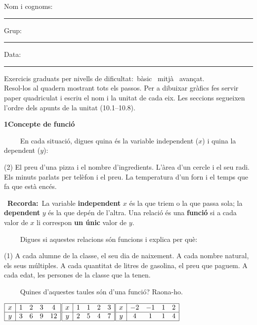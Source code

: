 \documentclass[11pt,a4paper]{article}
\newcommand{\estrelles}[1]{{\color{accent}\ifcase#1\or\faStar\faStar[regular]\faStar[regular]\or\faStar\faStar\faStar[regular]\or\faStar\faStar\faStar\fi}}
\newcounter{exer}
\newcommand{\ex}[1]{\par\needspace{4\baselineskip}\medskip\stepcounter{exer}\noindent{\color{navy}\bfseries\theexer.}\ \ {\small\estrelles{#1}}\ \ }
\newcommand{\seccio}[2]{\par\needspace{10\baselineskip}\bigskip
  \begin{tcolorbox}[colback=navy,colframe=navy,coltext=white,arc=2mm,boxrule=0pt,left=3mm,right=3mm,top=1.2mm,bottom=1.2mm]
  {\large\bfseries #1\quad #2}
  \end{tcolorbox}\vspace{-2pt}}
\newcommand{\recorda}[1]{\par\smallskip\begin{tcolorbox}[colback=accent!7,colframe=accent!55,arc=2mm,boxrule=0.5pt,left=2.5mm,right=2.5mm,top=1mm,bottom=1mm]\small{\color{accent}\faLightbulb[regular]}\ \textbf{Recorda:}\ #1\end{tcolorbox}}
\begin{document}
\thispagestyle{primera}

\vspace{10pt}
Nom i cognoms: \rule{8.4cm}{0.4pt}\hfill Grup: \rule{1.6cm}{0.4pt}\hfill Data: \rule{2.2cm}{0.4pt}
\vspace{8pt}

\begin{tcolorbox}[colback=soft,colframe=soft,arc=2mm,left=3mm,right=3mm,top=1.5mm,bottom=1.5mm]
\small Exercicis graduats per nivells de dificultat:\quad \estrelles{1}\ bàsic \qquad \estrelles{2}\ mitjà \qquad \estrelles{3}\ avançat.\\[2pt] Resol-los al quadern mostrant tots els passos. Per a dibuixar gràfics fes servir paper quadriculat i escriu el nom i la unitat de cada eix. Les seccions segueixen l'ordre dels apunts de la unitat (10.1--10.8).
\end{tcolorbox}

\seccio{1}{Concepte de funció}

\ex{1} En cada situació, digues quina és la variable independent ($x$) i quina la dependent ($y$):\begin{tasks}(2)
  \task El preu d'una pizza i el nombre d'ingredients.
  \task L'àrea d'un cercle i el seu radi.
  \task Els minuts parlats per telèfon i el preu.
  \task La temperatura d'un forn i el temps que fa que està encés.
\end{tasks}\recorda{La variable \textbf{independent} $x$ és la que triem o la que passa sola; la \textbf{dependent} $y$ és la que depén de l'altra. Una relació és una \textbf{funció} si a cada valor de $x$ li correspon \textbf{un únic} valor de $y$.}

\ex{1} Digues si aquestes relacions són funcions i explica per què:\begin{tasks}(1)
  \task A cada alumne de la classe, el seu dia de naixement.
  \task A cada nombre natural, els seus múltiples.
  \task A cada quantitat de litres de gasolina, el preu que paguem.
  \task A cada edat, les persones de la classe que la tenen.
\end{tasks}

\ex{1} Quines d'aquestes taules són d'una funció? Raona-ho.\par\smallskip\begin{center}$\begin{array}{|c|cccc|}\hline x&1&2&3&4\\\hline y&3&6&9&12\\\hline\end{array}$\hspace{0.7cm}$\begin{array}{|c|cccc|}\hline x&1&1&2&3\\\hline y&2&5&4&7\\\hline\end{array}$\hspace{0.7cm}$\begin{array}{|c|cccc|}\hline x&-2&-1&1&2\\\hline y&4&1&1&4\\\hline\end{array}$\end{center}
\end{document}
